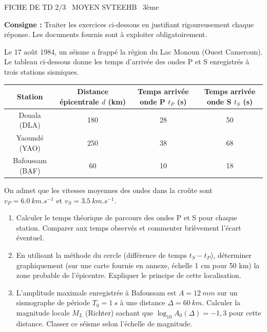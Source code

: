 \documentclass[11pt]{article}
\begin{document}
\begin{tcolorbox}[enhanced,colback=popink,colframe=popink,arc=10pt,boxrule=0pt,left=12pt,right=12pt,top=9pt,bottom=9pt]
{\color{white}\popxbold\small FICHE DE TD 2/3 \textbullet\ MOYEN \hfill SVTEEHB \textbullet\ 3ème\par}
\end{tcolorbox}
\vspace{4pt}
\noindent\textbf{Consigne :} Traiter les exercices ci-dessous en justifiant rigoureusement chaque réponse. Les documents fournis sont à exploiter obligatoirement.

\begin{exercice}
Le 17 août 1984, un séisme a frappé la région du Lac Monoun (Ouest Cameroun). Le tableau ci-dessous donne les temps d'arrivée des ondes P et S enregistrés à trois stations sismiques.

\begin{center}
\begin{tabular}{|c|c|c|c|}
\hline
Station & Distance épicentrale $d$ (km) & Temps arrivée onde P $t_P$ (s) & Temps arrivée onde S $t_S$ (s) \\
\hline
Douala (DLA) & 180 & 28 & 50 \\
Yaoundé (YAO) & 250 & 38 & 68 \\
Bafoussam (BAF) & 60 & 10 & 18 \\
\hline
\end{tabular}
\end{center}

On admet que les vitesses moyennes des ondes dans la croûte sont $v_P = \SI{6,0}{km.s^{-1}}$ et $v_S = \SI{3,5}{km.s^{-1}}$.

\begin{enumerate}
\item Calculer le temps théorique de parcours des ondes P et S pour chaque station. Comparer aux temps observés et commenter brièvement l'écart éventuel.
\item En utilisant la méthode du cercle (différence de temps $t_S - t_P$), déterminer graphiquement (sur une carte fournie en annexe, échelle 1 cm pour 50 km) la zone probable de l'épicentre. Expliquer le principe de cette localisation.
\item L'amplitude maximale enregistrée à Bafoussam est $A = \SI{12}{mm}$ sur un sismographe de période $T_0 = \SI{1}{s}$ à une distance $\Delta = \SI{60}{km}$. Calculer la magnitude locale $M_L$ (Richter) sachant que $\log_{10} A_0(\Delta) = -1,3$ pour cette distance. Classer ce séisme selon l'échelle de magnitude.
\end{enumerate}
\end{exercice}
\end{document}
